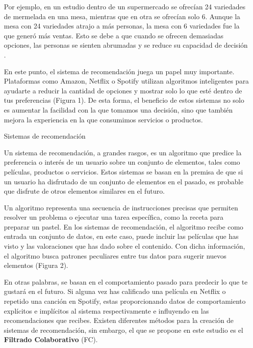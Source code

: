 \documentclass[letterpaper,10pt,final,hyphenatedtitles]{papertexKS}
\begin{document}
\begin{news}{2}
	Por ejemplo, en un estudio dentro de un supermercado se ofrecían 24 variedades de mermelada en una mesa, mientras que en otra se ofrecían solo 6. Aunque la mesa con 24 variedades atrajo a más personas, la mesa con 6 variedades fue la que generó más ventas. Esto se debe a que cuando se ofrecen demasiadas opciones, las personas se sienten abrumadas y se reduce su capacidad de decisión \cite{iyengar2011arte}.

	En este punto, el sistema de recomendación juega un papel muy importante. Plataformas como Amazon, Netflix o Spotify utilizan algoritmos inteligentes para ayudarte a reducir la cantidad de opciones y mostrar solo lo que esté dentro de tus preferencias (Figura 1). De esta forma, el beneficio de estos sistemas no solo es aumentar la facilidad con la que tomamos una decisión, sino que también mejora la experiencia en la que consumimos servicios o productos.
	
	\begin{center}
	\end{center}
	
	\noindent\textcolor{color}{\Large{Sistemas de recomendación}}

	Un sistema de recomendación, a grandes rasgos, es un algoritmo que predice la preferencia o interés de un usuario sobre un conjunto de elementos, tales como películas, productos o servicios. Estos sistemas se basan en la premisa de que si un usuario ha disfrutado de un conjunto de elementos en el pasado, es probable que disfrute de otros elementos similares en el futuro.

	Un algoritmo representa una secuencia de instrucciones precisas que permiten resolver un problema o ejecutar una tarea específica, como la receta para preparar un pastel. En los sistemas de recomendación, el algoritmo recibe como entrada un conjunto de datos, en este caso, puede incluir las películas que has visto y las valoraciones que has dado sobre el contenido. Con dicha información, el algoritmo busca patrones peculiares entre tus datos para sugerir nuevos elementos (Figura 2).

	\begin{center}
	\end{center}

	En otras palabras, se basan en el comportamiento pasado para predecir lo que te gustará en el futuro. Si alguna vez has calificado una película en Netflix o repetido una canción en Spotify, estas proporcionando datos de comportamiento explícitos e implícitos al sistema respectivamente e influyendo en las recomendaciones que recibes. Existen diferentes métodos para la creación de sistemas de recomendación, sin embargo, el que se propone en este estudio es el \textbf{Filtrado Colaborativo} (FC).


\end{news}
\end{document}
